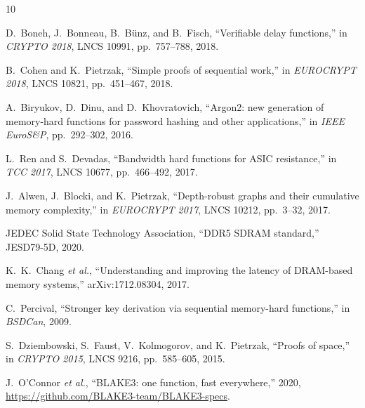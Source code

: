 \documentclass[conference,twocolumn]{IEEEtran}
\begin{document}
\FloatBarrier

\begin{thebibliography}{10}

D.~Boneh, J.~Bonneau, B.~B\"unz, and B.~Fisch,
``Verifiable delay functions,''
in \emph{CRYPTO 2018}, LNCS 10991, pp.~757--788, 2018.

B.~Cohen and K.~Pietrzak,
``Simple proofs of sequential work,''
in \emph{EUROCRYPT 2018}, LNCS 10821, pp.~451--467, 2018.

A.~Biryukov, D.~Dinu, and D.~Khovratovich,
``Argon2: new generation of memory-hard functions for password
hashing and other applications,''
in \emph{IEEE EuroS\&P}, pp.~292--302, 2016.

L.~Ren and S.~Devadas,
``Bandwidth hard functions for ASIC resistance,''
in \emph{TCC 2017}, LNCS 10677, pp.~466--492, 2017.

J.~Alwen, J.~Blocki, and K.~Pietrzak,
``Depth-robust graphs and their cumulative memory complexity,''
in \emph{EUROCRYPT 2017}, LNCS 10212, pp.~3--32, 2017.

JEDEC Solid State Technology Association,
``DDR5 SDRAM standard,'' JESD79-5D, 2020.

K.~K.~Chang \emph{et al.},
``Understanding and improving the latency of DRAM-based memory
systems,'' arXiv:1712.08304, 2017.

C.~Percival,
``Stronger key derivation via sequential memory-hard functions,''
in \emph{BSDCan}, 2009.

S.~Dziembowski, S.~Faust, V.~Kolmogorov, and K.~Pietrzak,
``Proofs of space,''
in \emph{CRYPTO 2015}, LNCS 9216, pp.~585--605, 2015.

J.~O'Connor \emph{et al.},
``BLAKE3: one function, fast everywhere,''
2020, \url{https://github.com/BLAKE3-team/BLAKE3-specs}.

\end{thebibliography}
\end{document}
